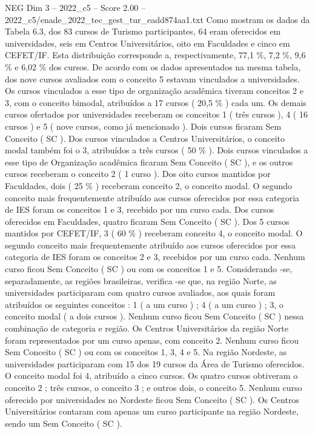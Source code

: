 \begin{textsample}{NEG Dim 3 – 2022\_c5 – Score 2.00 – 2022\_c5/enade\_2022\_tec\_gest\_tur\_eadd874aa1.txt}
Como mostram os dados da Tabela 6.3, dos 83 cursos de Turismo participantes, 64 eram oferecidos em universidades, seis em Centros Universitários, oito em Faculdades e cinco em CEFET/IF.
Esta distribuição corresponde a, respectivamente, 77,1 \%, 7,2 \%, 9,6 \% e 6,02 \% dos cursos.
De acordo com os dados apresentados na mesma tabela, dos nove cursos avaliados com o conceito 5 estavam vinculados a universidades.
Os cursos vinculados a esse tipo de organização acadêmica tiveram conceitos 2 e 3, com o conceito bimodal, atribuídos a 17 cursos ( 20,5 \% ) cada um.
Os demais cursos ofertados por universidades receberam os conceitos 1 ( três cursos ), 4 ( 16 cursos ) e 5 ( nove cursos, como já mencionado ).
Dois cursos ficaram Sem Conceito ( SC ).
Dos cursos vinculados a Centros Universitários, o conceito modal também foi o 3, atribuídos a três cursos ( 50 \% ).
Dois cursos vinculados a esse tipo de Organização acadêmica ficaram Sem Conceito ( SC ), e os outros cursos receberam o conceito 2 ( 1 curso ).
Dos oito cursos mantidos por Faculdades, dois ( 25 \% ) receberam conceito 2, o conceito modal.
O segundo conceito mais frequentemente atribuído aos cursos oferecidos por essa categoria de IES foram os conceitos 1 e 3, recebido por um curso cada.
Dos cursos oferecidos em Faculdades, quatro ficaram Sem Conceito ( SC ).
Dos 5 cursos mantidos por CEFET/IF, 3 ( 60 \% ) receberam conceito 4, o conceito modal.
O segundo conceito mais frequentemente atribuído aos cursos oferecidos por essa categoria de IES foram os conceitos 2 e 3, recebidos por um curso cada.
Nenhum curso ficou Sem Conceito ( SC ) ou com os conceitos 1 e 5.
Considerando -se, separadamente, as regiões brasileiras, verifica -se que, na região Norte, as universidades participaram com quatro cursos avaliados, aos quais foram atribuídos os seguintes conceitos : 1 ( a um curso ) ; 4 ( a um curso ) ; 3, o conceito modal ( a dois cursos ).
Nenhum curso ficou Sem Conceito ( SC ) nessa combinação de categoria e região.
Os Centros Universitários da região Norte foram representados por um curso apenas, com conceito 2.
Nenhum curso ficou Sem Conceito ( SC ) ou com os conceitos 1, 3, 4 e 5.
Na região Nordeste, as universidades participaram com 15 dos 19 cursos da Área de Turismo oferecidos.
O conceito modal foi 4, atribuído a cinco cursos.
Os quatro cursos obtiveram o conceito 2 ; três cursos, o conceito 3 ; e outros dois, o conceito 5.
Nenhum curso oferecido por universidades no Nordeste ficou Sem Conceito ( SC ).
Os Centros Universitários contaram com apenas um curso participante na região Nordeste, sendo um Sem Conceito ( SC ).

\end{textsample}

